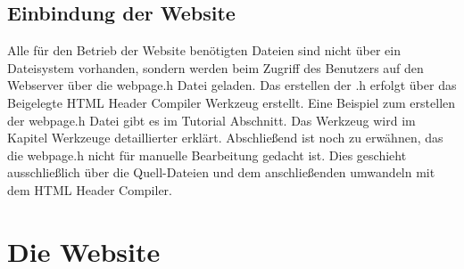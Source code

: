 \subsection{Einbindung der Website}

Alle für den Betrieb der Website benötigten Dateien sind nicht über ein
Dateisystem vorhanden, sondern werden beim Zugriff des Benutzers auf den
Webserver über die \textrm{webpage.h} Datei geladen.
Das erstellen der .h erfolgt über das Beigelegte \textrm{HTML Header Compiler}
Werkzeug erstellt. Eine Beispiel zum erstellen der \textrm{webpage.h} Datei gibt
es im Tutorial Abschnitt. Das Werkzeug wird im Kapitel Werkzeuge detaillierter
erklärt. Abschließend ist noch zu erwähnen, das die \textrm{webpage.h} nicht für manuelle
Bearbeitung gedacht ist. Dies geschieht ausschließlich über die Quell-Dateien
und dem anschließenden umwandeln mit dem \textrm{HTML Header Compiler}.

\section{Die Website}
